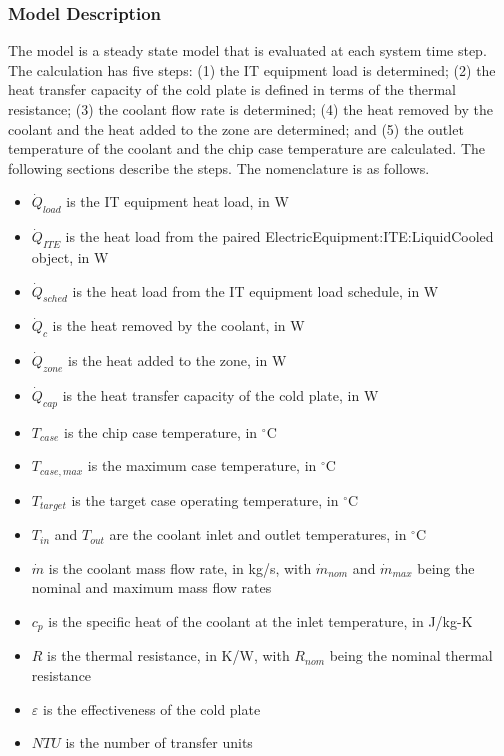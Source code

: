 \subsubsection{Model Description}\label{model-description-coilcoolingitecoldplate}

The model is a steady state model that is evaluated at each system time step. The calculation has five steps: (1) the IT equipment load is determined; (2) the heat transfer capacity of the cold plate is defined in terms of the thermal resistance; (3) the coolant flow rate is determined; (4) the heat removed by the coolant and the heat added to the zone are determined; and (5) the outlet temperature of the coolant and the chip case temperature are calculated. The following sections describe the steps. The nomenclature is as follows.

\begin{itemize}
\item \(\dot{Q}_{load}\) is the IT equipment heat load, in W
\item \(\dot{Q}_{ITE}\) is the heat load from the paired ElectricEquipment:ITE:LiquidCooled object, in W
\item \(\dot{Q}_{sched}\) is the heat load from the IT equipment load schedule, in W
\item \(\dot{Q}_{c}\) is the heat removed by the coolant, in W
\item \(\dot{Q}_{zone}\) is the heat added to the zone, in W
\item \(\dot{Q}_{cap}\) is the heat transfer capacity of the cold plate, in W
\item \(T_{case}\) is the chip case temperature, in $^\circ$C
\item \(T_{case,max}\) is the maximum case temperature, in $^\circ$C
\item \(T_{target}\) is the target case operating temperature, in $^\circ$C
\item \(T_{in}\) and \(T_{out}\) are the coolant inlet and outlet temperatures, in $^\circ$C
\item \(\dot{m}\) is the coolant mass flow rate, in kg/s, with \(\dot{m}_{nom}\) and \(\dot{m}_{max}\) being the nominal and maximum mass flow rates
\item \(c_p\) is the specific heat of the coolant at the inlet temperature, in J/kg-K
\item \(R\) is the thermal resistance, in K/W, with \(R_{nom}\) being the nominal thermal resistance
\item \(\varepsilon\) is the effectiveness of the cold plate
\item \(NTU\) is the number of transfer units
\end{itemize}

